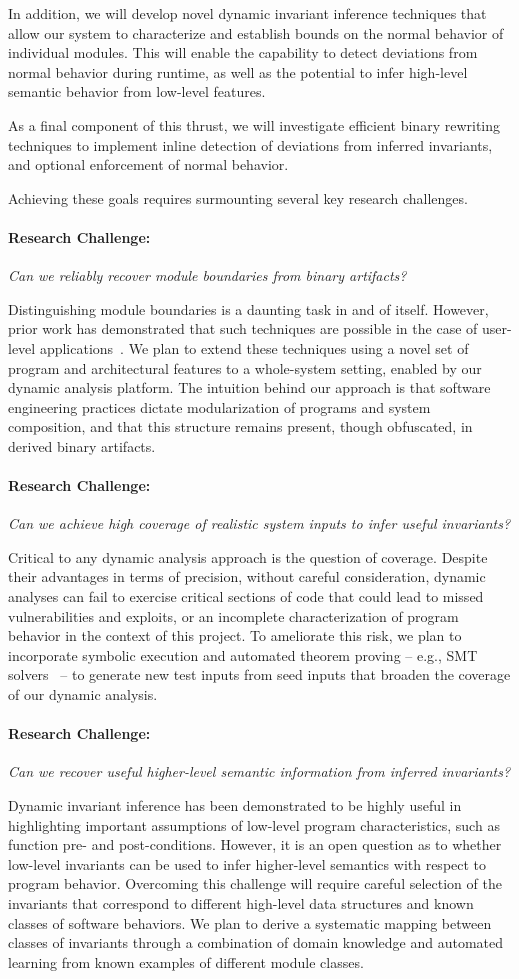 \documentclass[letterpaper,twoside,11pt,headings=small]{scrartcl}
\newcommand{\challenge}[1]{\paragraph{Research Challenge:} \emph{#1}}
\begin{document}
In addition, we will develop novel dynamic invariant inference techniques that
allow our system to characterize and establish bounds on the normal behavior
of individual modules.  This will enable the capability to detect deviations
from normal behavior during runtime, as well as the potential to infer high-level
semantic behavior from low-level features.

As a final component of this thrust, we will investigate efficient binary
rewriting techniques to implement inline detection of deviations from inferred
invariants, and optional enforcement of normal behavior.

Achieving these goals requires surmounting several key research challenges.

\challenge{Can we reliably recover module boundaries from binary artifacts?}

Distinguishing module boundaries is a daunting task in and of itself.  However,
prior work has demonstrated that such techniques are possible in the case of
user-level applications~\cite{bittau:nsdi2008:wedge}.  We plan to extend these
techniques using a novel set of program and architectural features to a whole-system
setting, enabled by our dynamic analysis platform.  The intuition behind our
approach is that software engineering practices dictate modularization of
programs and system composition, and that this structure remains present,
though obfuscated, in derived binary artifacts.

\challenge{Can we achieve high coverage of realistic system inputs to infer useful invariants?}

Critical to any dynamic analysis approach is the question of coverage. Despite
their advantages in terms of precision, without careful consideration, dynamic
analyses can fail to exercise critical sections of code that could lead to
missed vulnerabilities and exploits, or an incomplete characterization of
program behavior in the context of this project.  To ameliorate this risk, we
plan to incorporate symbolic execution and automated theorem proving -- e.g.,
SMT solvers~\cite{demoura:tacas2008:z3,zheng:fse2013:z3str} -- to generate new test inputs from
seed inputs that broaden the coverage of our dynamic analysis.

\challenge{Can we recover useful higher-level semantic information from inferred invariants?}

Dynamic invariant inference has been demonstrated to be highly useful in
highlighting important assumptions of low-level program characteristics, such
as function pre- and post-conditions.  However, it is an open question as to
whether low-level invariants can be used to infer higher-level semantics with
respect to program behavior.  Overcoming this challenge will require careful
selection of the invariants that correspond to different high-level data
structures and known classes of software behaviors.  We plan to derive a
systematic mapping between classes of invariants through a combination of
domain knowledge and automated learning from known examples of different
module classes.
\end{document}
